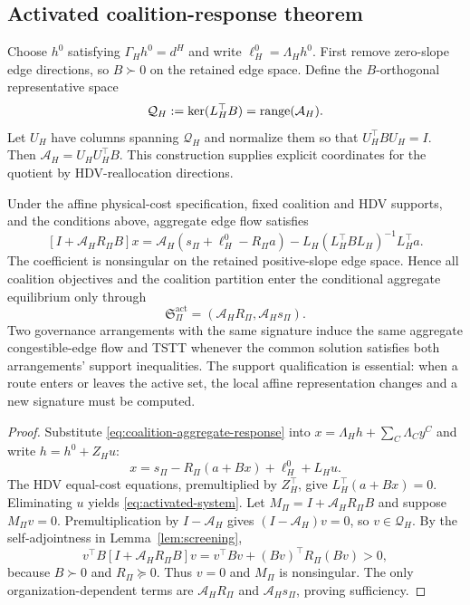 \subsection{Activated coalition-response theorem}\label{sec:activated_theorem}

Choose $h^0$ satisfying $\Gamma_Hh^0=d^H$ and write $\ell_H^0=\Lambda_Hh^0$. First remove zero-slope edge directions, so $B\succ0$ on the retained edge space. Define the $B$-orthogonal representative space
\begin{equation}\label{eq:hdv-representative-space}
 \mathcal Q_H:=\ker(L_H^\top B)=\operatorname{range}(\mathcal A_H).
\end{equation}
Let $U_H$ have columns spanning $\mathcal Q_H$ and normalize them so that $U_H^\top B U_H=I$. Then $\mathcal A_H=U_HU_H^\top B$. This construction supplies explicit coordinates for the quotient by HDV-reallocation directions.

\begin{theorem}\label{thm:activated-response}
Under the affine physical-cost specification, fixed coalition and HDV supports, and the conditions above, aggregate edge flow satisfies
\begin{equation}\label{eq:activated-system}
 [I+\mathcal A_HR_\Pi B]x
 =\mathcal A_H(s_\Pi+\ell_H^0-R_\Pi a)
 -L_H(L_H^\top BL_H)^{-1}L_H^\top a.
\end{equation}
The coefficient is nonsingular on the retained positive-slope edge space. Hence all coalition objectives and the coalition partition enter the conditional aggregate equilibrium only through
\begin{equation}\label{eq:activated-signature}
 \boxed{\mathfrak S_\Pi^{\mathrm{act}}=(\mathcal A_HR_\Pi,\mathcal A_Hs_\Pi).}
\end{equation}
Two governance arrangements with the same signature induce the same aggregate congestible-edge flow and TSTT whenever the common solution satisfies both arrangements' support inequalities. The support qualification is essential: when a route enters or leaves the active set, the local affine representation changes and a new signature must be computed.
\end{theorem}

\begin{proof}
Substitute \eqref{eq:coalition-aggregate-response} into $x=\Lambda_Hh+\sum_C\Lambda_Cy^C$ and write $h=h^0+Z_Hu$:
\[
 x=s_\Pi-R_\Pi(a+Bx)+\ell_H^0+L_Hu.
\]
The HDV equal-cost equations, premultiplied by $Z_H^\top$, give $L_H^\top(a+Bx)=0$. Eliminating $u$ yields \eqref{eq:activated-system}. Let $M_\Pi=I+\mathcal A_HR_\Pi B$ and suppose $M_\Pi v=0$. Premultiplication by $I-\mathcal A_H$ gives $(I-\mathcal A_H)v=0$, so $v\in\mathcal Q_H$. By the self-adjointness in Lemma~\ref{lem:screening},
\[
 v^\top B[I+\mathcal A_HR_\Pi B]v
 =v^\top Bv+(Bv)^\top R_\Pi(Bv)>0,
\]
because $B\succ0$ and $R_\Pi\succeq0$. Thus $v=0$ and $M_\Pi$ is nonsingular. The only organization-dependent terms are $\mathcal A_HR_\Pi$ and $\mathcal A_Hs_\Pi$, proving sufficiency.
\end{proof}

